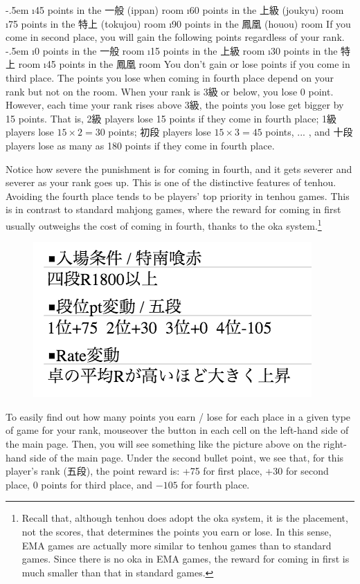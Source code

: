 \bi \itemsep-.5em
	\i 45 points in the 一般 ({\jap ippan}) room
	\i 60 points in the 上級 ({\jap joukyu}) room
	\i 75 points in the 特上 ({\jap tokujou}) room
	\i 90 points in the 鳳凰 ({\jap houou}) room
\ei
If you come in second place, you will gain the following points regardless of your rank.
	\bi \itemsep-.5em
	\i 0 points in the 一般 room
	\i 15 points in the 上級 room
	\i 30 points in the 特上 room
	\i 45 points in the 鳳凰 room
\ei
You don't gain or lose points if you come in third place. 
The points you lose when coming in fourth place depend on your rank but not on the room. When your rank is 3級 or below, you lose 0 point. However, each time your rank rises above 3級, the points you lose get bigger by 15 points. 
That is, 2級 players lose 15 points if they come in fourth place; 1級 players lose $15 \times 2 = 30$ points; 初段 players lose $15 \times 3 = 45$ points, ... , and 十段 players lose as many as 180 points if they come in fourth place.

\bigskip
Notice how severe the punishment is for coming in fourth, and it gets severer and severer as your rank goes up. This is one of the distinctive features of {\jap tenhou}. 
Avoiding the fourth place tends to be players' top priority in {\jap tenhou} games. This is in contrast to standard mahjong games, where the reward for coming in first usually outweighs the cost of coming in fourth, thanks to the {\jap oka} system.\footnote{Recall that, although {\jap tenhou} does adopt the {\jap oka} system, it is the placement, not the scores, that determines the points you earn or lose. In this sense, EMA games are actually more similar to {\jap tenhou} games than to standard games. Since there is no {\jap oka} in EMA games, the reward for coming in first is much smaller than that in standard games.} 

\bigskip
\begin{figure}
\vspace{-30pt}
\begin{center}
\includegraphics[width=.45\textwidth,clip]{figs/pt}
\end{center}
\vspace{-40pt}
\end{figure}
To easily find out how many points you earn / lose for each place in a given type of game for your rank, mouseover the  button in each cell on the left-hand side of the main page. Then, you will see something like the picture above on the right-hand side of the main page. Under the second bullet point, we see that, for this player's rank (五段), the point reward is: +75 for first place, +30 for second place, 0 points for third place, and $-105$ for fourth place. 

